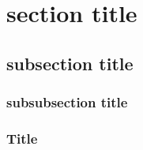 \documentclass{beamer}
\begin{document}
\section{section title}
\subsection{subsection title}
\subsubsection{subsubsection title}

\begin{frame}
\frametitle{Title}

\end{frame}
\end{document}
